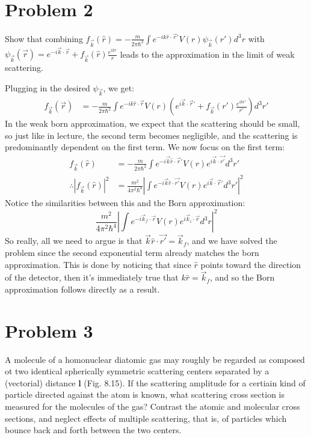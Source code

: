 \documentclass[10pt]{article}
\begin{document}
	\section*{Problem 2}
	Show that combining $f_{\vec k} (\hat{r}) = -\frac{m}{2\pi \hbar^2}\int e^{-i k \hat{r} \cdot \vec r'} V(r)
	\psi_{\vec k} (r') d^3r$ with $\psi_{\vec k}(\vec r) = e^{-i \vec k \cdot \vec r} + f_{\vec k}(\hat{r})
	\frac{e^{ikr}}{r}$ leads to the approximation in the limit of weak scattering.

	\begin{solution}
		Plugging in the desired $\psi_{\vec k}$, we get:
		\begin{align*}
			f_{\vec k}(\vec r) &= -\frac{m}{2 \pi \hbar^2}\int e^{-i k \hat{r} \cdot \vec{r}} V(r) \left( 
				e^{i \vec k \cdot \vec r'} + f_{\vec k}(r') \frac{e^{ikr'}}{r'}\right) d^3r'
		\end{align*}
		In the weak born approximation, we expect that the scattering should be small, so just like in lecture,
		the second term becomes negligible, and the scattering is predominantly dependent on the first term. 
		We now focus on the first term: 
		\begin{align*}
			f_{\vec k}(\hat{r}) &= -\frac{m}{2\pi \hbar^2}\int e^{-i \vec k \hat{r} \cdot \vec r'} V(r) 
			e^{i \vec k \cdot \vec{r'}} d^3r'\\
			\therefore |f_{\vec k}(\hat{r})|^2 &= \frac{m^2}{4\pi^2 \hbar^4}\left| \int e^{-i \vec k \hat{ r}
			\cdot \vec{r'}} V(r) e^{i \vec k \cdot \vec r'} d^3r'\right|^2
		\end{align*} 
		Notice the similarities between this and the Born approximation:
		\[
		\frac{m^2}{4\pi^2 \hbar^4}\left|\int e^{-i \vec k_f \cdot \vec r} V(r) e^{i \vec k_i \cdot \vec r}
		d^3r\right|^2
		\] 
		So really, all we need to argue is that $\vec k \hat{r} \cdot \vec{r'} = \vec k_f$, and we have solved 
		the problem since the second exponential term already matches the born approximation. This is done 
		by noticing that since $\hat{r}$ points toward the direction of the detector, then it's immediately 
		true that $k \hat{r} = \vec k_f$, and so the Born approximation follows directly as a result. 
	\end{solution}


	\pagebreak

	\section*{Problem 3}

	A molecule of a homonuclear diatomic gas may roughly be regarded as composed ot two identical spherically 
	symmetric scattering centers separated by a (vectorial) distance $\mathbf l$ (Fig. 8.15). If the scattering
	amplitude for a certiain kind of particle directed against the atom is known, what scattering cross section
	is measured for the molecules of the gas? Contrast the atomic and molecular cross sections, and neglect 
	effects of multiple scattering, that is, of particles which bounce back and forth between the two centers.
\end{document}
